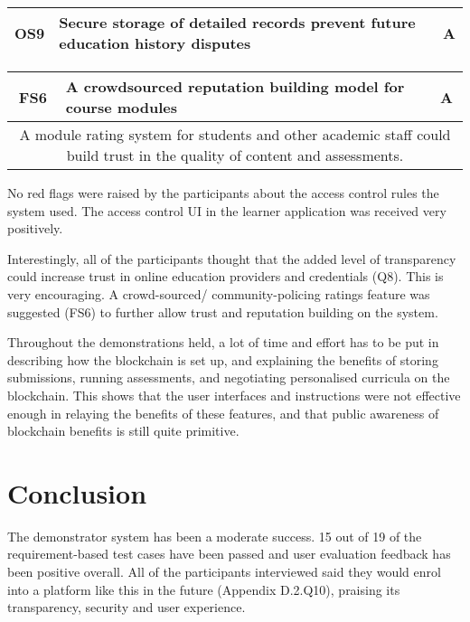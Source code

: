 \begin{table}[!ht]
	\begin{tabularx}{\textwidth}{|c|X|c|}
		\hline
		OS9 & \textbf{Secure storage of detailed records prevent future education history disputes} & A \\
		\hline
	\end{tabularx}
\end{table}

\begin{table}[!ht]
	\begin{tabularx}{\textwidth}{|c|X|c|}
		\hline
		FS6 & \textbf{A crowdsourced reputation building model for course modules} & A \\
		\hline
		\multicolumn{3}{|X|}{
			A module rating system for students and other academic staff could build trust
			in the quality of content and assessments.
		}                                                                              \\
		\hline
	\end{tabularx}
\end{table}

No red flags were raised by the participants about the access control rules the system used.
The access control UI in the learner application was received very positively.

Interestingly, all of the participants thought that the added level of transparency 
could increase trust in online education providers and credentials (Q8).
This is very encouraging. A crowd-sourced/ community-policing ratings feature was 
suggested (FS6) to further allow trust and reputation building on the system.

Throughout the demonstrations held, a lot of time and effort has to be put in describing
how the blockchain is set up, and explaining the benefits of storing submissions,
running assessments, and negotiating personalised curricula on the blockchain.
This shows that the user interfaces and instructions were not effective enough in relaying the
benefits of these features, and that public awareness of blockchain benefits is still quite
primitive.

\section{Conclusion}

The demonstrator system has been a moderate success. 15 out of 19 of the requirement-based test cases have been passed and
user evaluation feedback has been positive overall.
All of the participants interviewed said they would enrol into a platform like this in the future 
(Appendix D.2.Q10), praising its transparency, security and user experience.

